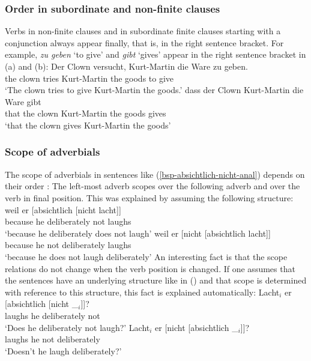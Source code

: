 \subsubsection{Order in subordinate and non-finite clauses}

Verbs in non-finite clauses and in subordinate finite clauses starting with a conjunction
  always appear finally, that is, in the right sentence bracket. For example, \emph{zu geben} `to
  give' and \emph{gibt} `gives' appear in the right sentence bracket in (a) and (b):
\eal
\ex 
\gll Der Clown versucht, Kurt-Martin die Ware zu geben.\\
     the clown tries     Kurt-Martin the goods to give\\
\glt `The clown tries to give Kurt-Martin the goods.'
\ex 
\gll dass der Clown Kurt-Martin die Ware gibt\\
     that the clown Kurt-Martin the goods gives\\
\glt `that the clown gives Kurt-Martin the goods'
\zl



\subsubsection{Scope of adverbials}

The scope of adverbials in sentences like (\ref{bsp-absichtlich-nicht-anal}) depends on their order \citep[Section~2.3]{Netter92}:
The left-most adverb scopes over the following adverb and over the verb in final
position. This was explained by assuming the following structure:
\eal
\label{bsp-absichtlich-nicht-anal}
\ex 
\gll weil er  [absichtlich [nicht lacht]]\\
     because he \hphantom{[}deliberately \hphantom{[}not laughs\\
\glt `because he deliberately does not laugh'
\ex 
\gll weil er [nicht [absichtlich lacht]]\\
     because he \hphantom{[}not \hphantom{[}deliberately laughs\\
\glt `because he does not laugh deliberately'
\zl
An interesting fact is that the scope relations do not change when the verb position is changed. If
one assumes that the sentences have an underlying structure like in () and that scope is
determined with reference to this structure, this fact is explained automatically:
\eal
\label{bsp-absichtlich-nicht-anal-v1}
\ex 
\gll Lacht$_i$ er [absichtlich [nicht \_$_i$]]?\\
     laughs he \hphantom{[}deliberately \hphantom{[}not\\
\glt `Does he deliberately not laugh?'
\ex 
\gll Lacht$_i$ er [nicht [absichtlich \_$_i$]]?\\
     laughs he \hphantom{[}not \hphantom{[}deliberately\\
\glt `Doesn't he laugh deliberately?'
\zl
\nocite{Hoehle88a,Hoehle97a}


